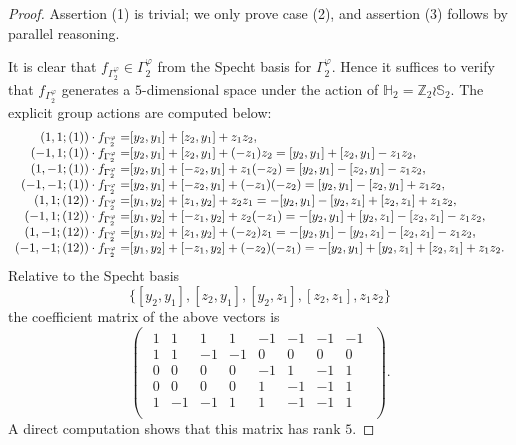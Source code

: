 \documentclass{amsart}
\theoremstyle{definition}
\theoremstyle{remark}
\numberwithin{equation}{section}
\def \Ga{\Gamma}
\def \vp{\varphi}
\def \H{\mathbb{H}}
\def \S{\mathbb{S}}
\def \Z{\mathbb{Z}}
\begin{document}
\begin{proof}
	Assertion (1) is trivial; we only prove case (2), and assertion (3) follows by parallel reasoning.
	
	It is clear that $f_{\Ga_2^{\vp}} \in \Ga_2^{\vp}$ from the Specht basis for $\Ga_2^{\vp}$. Hence it suffices to verify that $f_{\Ga_2^\vp}$ generates a $5$-dimensional space under the action of $\H_2=\Z_2 \wr \S_2$. The explicit group actions are computed below:
	\[
	\begin{array}{r@{}l}
		(1,1;(1)) \cdot f_{\Ga_2^\vp} =& [y_2,y_1]+[z_2,y_1]+z_1z_2, \\
		(-1,1;(1)) \cdot f_{\Ga_2^\vp} =& [y_2,y_1]+[z_2,y_1]+(-z_1)z_2 = [y_2,y_1]+[z_2,y_1]-z_1z_2, \\
		(1,-1;(1)) \cdot f_{\Ga_2^\vp} =& [y_2,y_1]+[-z_2,y_1]+z_1(-z_2) = [y_2,y_1]-[z_2,y_1]-z_1z_2, \\
		(-1,-1;(1)) \cdot f_{\Ga_2^\vp} =& [y_2,y_1]+[-z_2,y_1]+(-z_1)(-z_2) = [y_2,y_1]-[z_2,y_1]+z_1z_2, \\
		(1,1;(12)) \cdot f_{\Ga_2^\vp} =& [y_1,y_2]+[z_1,y_2]+z_2z_1 = -[y_2,y_1]-[y_2,z_1]+[z_2,z_1]+z_1z_2, \\
		(-1,1;(12)) \cdot f_{\Ga_2^\vp} =& [y_1,y_2]+[-z_1,y_2]+z_2(-z_1) = -[y_2,y_1]+[y_2,z_1]-[z_2,z_1]-z_1z_2, \\
		(1,-1;(12)) \cdot f_{\Ga_2^\vp} =& [y_1,y_2]+[z_1,y_2]+(-z_2)z_1 = -[y_2,y_1]-[y_2,z_1]-[z_2,z_1]-z_1z_2, \\
		(-1,-1;(12)) \cdot f_{\Ga_2^\vp} =& [y_1,y_2]+[-z_1,y_2]+(-z_2)(-z_1) = -[y_2,y_1]+[y_2,z_1]+[z_2,z_1]+z_1z_2. \\
	\end{array}
	\]
	Relative to the Specht basis
	\[
	\big\{[y_2,y_1], [z_2,y_1], [y_2,z_1], [z_2,z_1], z_1z_2\big\}
	\]
	the coefficient matrix of the above vectors is
	\[
	\begin{pmatrix}
		\begin{array}{rrrrrrrr}
			1& 1& 1& 1& -1& -1& -1& -1 \\
			1& 1& -1& -1& 0& 0& 0& 0 \\
			0& 0& 0& 0& -1& 1& -1& 1 \\
			0& 0& 0& 0& 1& -1& -1& 1 \\
			1& -1& -1& 1& 1& -1& -1& 1 \\
		\end{array}
	\end{pmatrix}.
	\]
	A direct computation shows that this matrix has rank $5$.
\end{proof}
\end{document}
